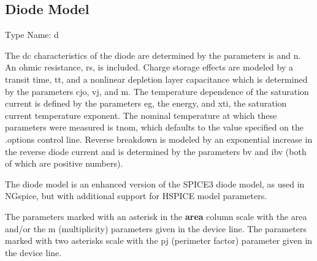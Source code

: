 \subsection{Diode Model}
\label{diomodel}


{\cb Type Name:} {\vt d}

The dc characteristics of the diode are determined by the parameters
{\vt is} and {\vt n}.  An ohmic resistance, {\vt rs}, is included.
Charge storage effects are modeled by a transit time, {\vt tt}, and a
nonlinear depletion layer capacitance which is determined by the
parameters {\vt cjo}, {\vt vj}, and {\vt m}.  The temperature
dependence of the saturation current is defined by the parameters {\vt
eg}, the energy, and {\vt xti}, the saturation current temperature
exponent.  The nominal temperature at which these parameters were
measured is {\vt tnom}, which defaults to the value
specified on the {\vt .options} control line.  Reverse breakdown is
modeled by an exponential increase in the reverse diode current and is
determined by the parameters {\vt bv} and {\vt ibv} (both of which are
positive numbers).

The diode model is an enhanced version of the SPICE3 diode model, as
used in NGspice, but with additional support for HSPICE model
parameters.

The parameters marked with an asterisk in the {\bf area} column scale
with the {\vt area} and/or the {\vt m} (multiplicity) parameters given
in the device line.  The parameters marked with two asterisks scale
with the {\vt pj} (perimeter factor) parameter given in the device
line.

